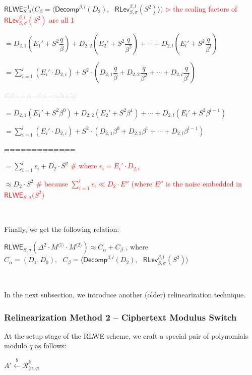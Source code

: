 $\textsf{RLWE}_{S, \sigma}^{-1}(C_\beta = \bm{\langle} \textsf{Decomp}^{\beta, l}(D_2), \text{ } \textsf{RLev}_{S, \sigma}^{\beta, l}( S^2) \bm{\rangle} \bm{)}$ \textcolor{red}{ $\rhd$ the scaling factors of $\textsf{RLev}_{S, \sigma}^{\beta, l}( S^2)$ are all 1}

$= D_{2,1}(E_1' +  S^2\dfrac{q}{\beta}) + D_{2,2}(E_2' +  S^2\dfrac{q}{\beta^2}) + \cdots + D_{2,l}(E_l' +  S^2\dfrac{q}{\beta^l})$

$= \sum\limits_{i=1}^{l} (E_i'\cdot D_{2,i}) +  S^2\cdot(D_{2,1}\dfrac{q}{\beta} + D_{2,2}\dfrac{q}{\beta^2} + \cdots + D_{2, l}\dfrac{q}{\beta^l})$

=============

$= D_{2,1}(E_1' +  S^2 \beta^0) + D_{2,2}(E_2' +  S^2 \beta^1) + \cdots + D_{2,l}(E_l' +  S^2 \beta^{l-1})$

$= \sum\limits_{i=1}^{l} (E_i'\cdot D_{2,i}) +  S^2\cdot(D_{2,1}\beta^0 + D_{2,2}\beta^1 + \cdots + D_{2, l}\beta^{l-1})$

=============

$= \sum\limits_{i=1}^{l} \epsilon_{i} + D_2\cdot S^2$ \textcolor{red}{ \text{ } \# where $\epsilon_i = E_i'\cdot D_{2,i}$}

$\approx D_2\cdot S^2$ \textcolor{red}{ \text{ } \# because $\sum\limits_{i=1}^{l} \epsilon_{i} \ll D_2\cdot E''$ (where $E''$ is the noise embedded in $\textsf{RLWE}_{S, \sigma}\bm(S^2\bm)$}

$ $

Finally, we get the following relation:

$\textsf{RLWE}_{S, \sigma}(\Delta^2 \cdot M^{\langle 1 \rangle} \cdot M^{\langle 2 \rangle}) \approx C_\alpha + C_\beta$ \text{ } , where \text{ } $C_\alpha = (D_1, D_0), \text{ } C_\beta = \bm{\langle}  \textsf{Decomp}^{\beta, l}(D_2), \text{ } \textsf{RLev}_{S, \sigma}^{\beta, l}( S^2) \bm{\rangle}$

$ $

In the next subsection, we introduce another (older) relinearization technique. 

\subsubsection{Relinearization Method 2 -- Ciphertext Modulus Switch}
\label{subsubsec:relinearization-modulus-switch}


At the setup stage of the RLWE scheme, we craft a special pair of polynomials modulo $q$ as follows: 

$A'  \xleftarrow{\$} \mathcal{R}_{\langle n,q\rangle }^{k}$

